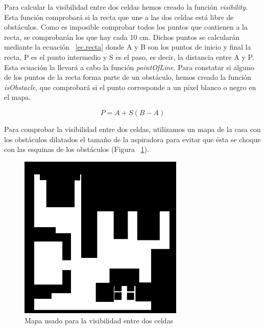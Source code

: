 Para calcular la visibilidad entre dos celdas hemos creado la función \textit{visibility}. Esta función comprobará si la recta que une a las dos celdas está libre de obstáculos. Como es imposible comprobar todos los puntos que contienen a la recta, se comprobarán los que hay cada 10 cm. Dichos puntos se calcularán mediante la ecuación ~\ref{ec.recta} donde A y B son los puntos de inicio y final la recta, P es el punto intermedio y S es el paso, es decir, la distancia entre A y P. Esta ecuación la llevará a cabo la función \textit{pointOfLine}. Para constatar si alguno de los puntos de la recta forma parte de un obstáculo, hemos creado la función \textit{isObstacle}, que comprobará si el punto corresponde a un píxel blanco o negro en el mapa.

\begin{equation}
\label{ec.recta}
P = A + S(B - A)
\end{equation}


Para comprobar la visibilidad entre dos celdas, utilizamos un mapa de la casa con los obstáculos dilatados el tamaño de la aspiradora para evitar que ésta se choque con las esquinas de los obstáculos (Figura ~\ref{fig.mapaVis}).

\begin{figure}[H]
  \begin{center}
    \includegraphics[width=0.7\textwidth]{figures/Vacuum/mapaVis.png}
		\caption{Mapa usado para la visibilidad entre dos celdas}
		\label{fig.mapaVis}
		\end{center}
\end{figure}

